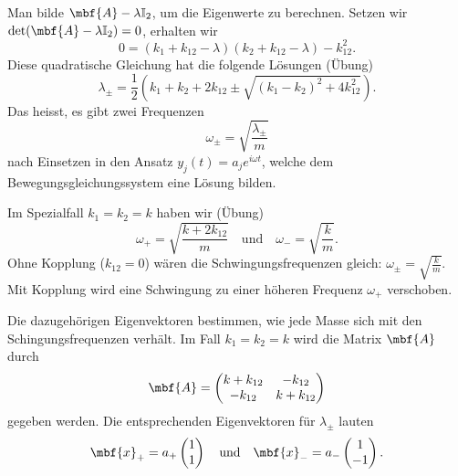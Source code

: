 \begin{beispiel}
    Man bilde $\mbf{A}-\lambda \mathbb{I}_2$, um die Eigenwerte zu berechnen. Setzen wir $\det(\mbf{A}-\lambda \mathbb{I}_2) = 0$, erhalten wir  
    \begin{equation}
      0=(k_1+k_{12}-\lambda)(k_2+k_{12}-\lambda)-k_{12}^2.
    \end{equation} 
    Diese quadratische Gleichung hat die folgende Lösungen (Übung)
    \begin{equation}
      \lambda_{\pm} = \frac12\left(k_1+k_2 + 2k_{12}\pm \sqrt{(k_1-k_2)^2+4k_{12}^2}\right).
    \end{equation}
    Das heisst, es gibt zwei Frequenzen  
    \begin{equation}
      \omega_{\pm} = \sqrt{\frac{\lambda_{\pm}}{m}}
    \end{equation}
    nach Einsetzen in den Ansatz $y_j(t) = a_j e^{i\omega t}$, welche dem Bewegungsgleichungssystem eine Lösung bilden. 

    Im Spezialfall $k_1=k_2=k$ haben wir (Übung)
    \begin{equation}
        \omega_{+} = \sqrt{\frac{k+2k_{12}}{m}} \quad\text{und}\quad \omega_- = \sqrt{\frac{k}{m}}.
    \end{equation}
    Ohne Kopplung ($k_{12} = 0$) wären die Schwingungsfrequenzen gleich: $\omega_{\pm}=\sqrt{\frac{k}{m}}$. Mit Kopplung wird eine Schwingung zu einer höheren Frequenz $\omega_+$ verschoben. 

    Die dazugehörigen Eigenvektoren bestimmen, wie jede Masse sich mit den Schingungsfrequenzen verhält. Im Fall $k_1=k_2=k$ wird die Matrix $\mbf{A}$ durch
    \begin{equation}
      \mbf{A} = \begin{pmatrix}
        k+k_{12} & -k_{12} \\ -k_{12} & k+k_{12}
      \end{pmatrix} 
    \end{equation} 
    gegeben werden. Die entsprechenden Eigenvektoren für $\lambda_{\pm}$ lauten
    \begin{equation}
      \mbf{x}_{+} = a_+ \begin{pmatrix}
        1 \\ 1
      \end{pmatrix} \quad \text{und}\quad \mbf{x}_{-} = a_- \begin{pmatrix}
        1 \\ -1
      \end{pmatrix}.
    \end{equation} 


\end{beispiel}
